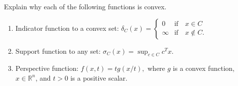 \documentclass[10pt]{article}
\begin{document}
\maketitle

\begin{problem}[Problem 1]
Explain why each of the following functions is convex. 

\begin{enumerate}[label=(\alph*)]
\item Indicator function to a convex set: 
\(
\delta_C(x) = \begin{cases} 0 & \mbox{if} \quad x \in C \\ \infty & \mbox{if} \quad x \not \in C. \end{cases}
\)

\item Support function to any set: 
\(
\sigma_C(x) = \sup_{c \in C} c^Tx.
\)

\item Perspective function: 
\(
f(x,t) = tg(x/t), 
\)
where \( g \) is a convex function, \( x\in \mathbb{R}^n \), and \( t>0 \) is a positive scalar. 

\end{enumerate}
\end{problem}
\end{document}
